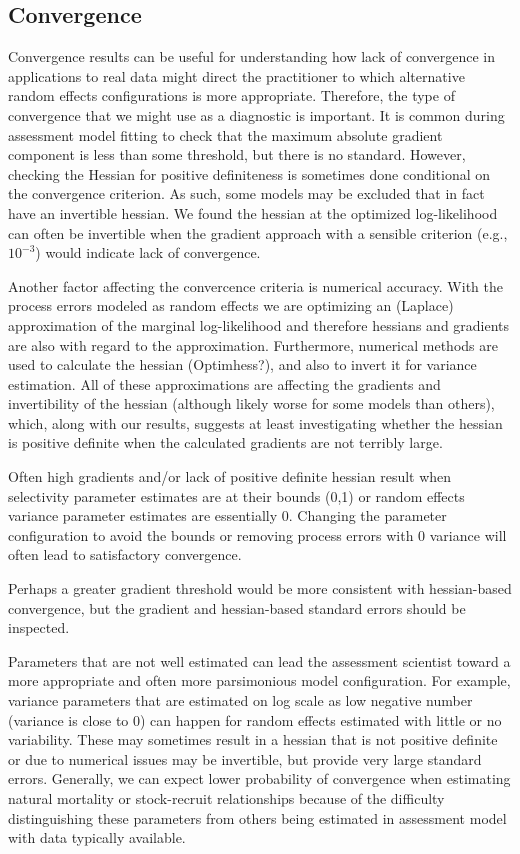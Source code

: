 \documentclass[
  12pt,
]{article}
\begin{document}
\hypertarget{convergence}{%
\subsection*{Convergence}\label{convergence}}

Convergence results can be useful for understanding how lack of
convergence in applications to real data might direct the practitioner
to which alternative random effects configurations is more appropriate.
Therefore, the type of convergence that we might use as a diagnostic is
important. It is common during assessment model fitting to check that
the maximum absolute gradient component is less than some threshold, but
there is no standard. However, checking the Hessian for positive
definiteness is sometimes done conditional on the convergence criterion.
As such, some models may be excluded that in fact have an invertible
hessian. We found the hessian at the optimized log-likelihood can often
be invertible when the gradient approach with a sensible criterion
(e.g., \(10^{-3}\)) would indicate lack of convergence.

Another factor affecting the convercence criteria is numerical accuracy.
With the process errors modeled as random effects we are optimizing an
(Laplace) approximation of the marginal log-likelihood and therefore
hessians and gradients are also with regard to the approximation.
Furthermore, numerical methods are used to calculate the hessian
(Optimhess?), and also to invert it for variance estimation. All of
these approximations are affecting the gradients and invertibility of
the hessian (although likely worse for some models than others), which,
along with our results, suggests at least investigating whether the
hessian is positive definite when the calculated gradients are not
terribly large.

Often high gradients and/or lack of positive definite hessian result
when selectivity parameter estimates are at their bounds (0,1) or random
effects variance parameter estimates are essentially 0. Changing the
parameter configuration to avoid the bounds or removing process errors
with 0 variance will often lead to satisfactory convergence.

Perhaps a greater gradient threshold would be more consistent with
hessian-based convergence, but the gradient and hessian-based standard
errors should be inspected.

Parameters that are not well estimated can lead the assessment scientist
toward a more appropriate and often more parsimonious model
configuration. For example, variance parameters that are estimated on
log scale as low negative number (variance is close to 0) can happen for
random effects estimated with little or no variability. These may
sometimes result in a hessian that is not positive definite or due to
numerical issues may be invertible, but provide very large standard
errors. Generally, we can expect lower probability of convergence when
estimating natural mortality or stock-recruit relationships because of
the difficulty distinguishing these parameters from others being
estimated in assessment model with data typically available.
\end{document}
